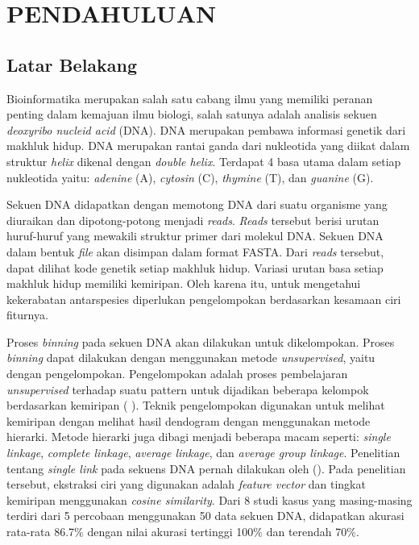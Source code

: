 \section*{PENDAHULUAN} %
\subsection*{Latar Belakang}
Bioinformatika merupakan salah satu cabang ilmu yang memiliki peranan penting dalam kemajuan ilmu biologi, salah satunya adalah analisis sekuen \textit{deoxyribo nucleid acid} (DNA). DNA merupakan pembawa informasi genetik dari makhluk hidup. DNA merupakan rantai ganda dari nukleotida yang diikat dalam struktur \textit{helix} dikenal dengan \textit{double helix}.  Terdapat 4 basa utama dalam setiap nukleotida yaitu: \textit{adenine} (A), \textit{cytosin} (C), \textit{thymine} (T), dan \textit{guanine} (G).

Sekuen DNA didapatkan dengan memotong DNA dari suatu organisme yang diuraikan dan dipotong-potong menjadi \textit{reads}. \textit{Reads} tersebut berisi urutan huruf-huruf yang mewakili struktur primer dari molekul DNA. Sekuen DNA dalam bentuk \textit{file} akan disimpan dalam format FASTA. Dari \textit{reads} tersebut, dapat dilihat kode genetik setiap makhluk hidup. Variasi urutan basa setiap makhluk hidup memiliki kemiripan. Oleh karena itu, untuk mengetahui kekerabatan antarspesies diperlukan pengelompokan berdasarkan kesamaan ciri fiturnya.

Proses \textit{binning} pada sekuen DNA akan dilakukan untuk dikelompokan. Proses \textit{binning} dapat dilakukan dengan menggunakan metode \textit{unsupervised}, yaitu dengan pengelompokan. Pengelompokan adalah proses pembelajaran \textit{unsupervised} terhadap suatu pattern untuk dijadikan beberapa kelompok berdasarkan kemiripan (\citeauthor{JAIN1999} \cite*{JAIN1999}). Teknik pengelompokan digunakan untuk melihat kemiripan dengan melihat hasil dendogram dengan menggunakan metode hierarki. Metode hierarki juga dibagi menjadi beberapa macam seperti: \textit{single linkage}, \textit{complete linkage}, \textit{average linkage},  dan \textit{average group linkage}. Penelitian tentang \textit{single link} pada sekuens DNA pernah dilakukan oleh \citeauthor{TAMSIN2013} (\cite*{TAMSIN2013}). Pada penelitian tersebut, ekstraksi ciri yang digunakan adalah \textit{feature vector} dan tingkat kemiripan menggunakan \textit{cosine similarity}. Dari 8 studi kasus yang masing-masing terdiri dari 5 percobaan menggunakan 50 data sekuen DNA, didapatkan akurasi rata-rata 86.7$\%$ dengan nilai akurasi tertinggi 100$\%$ dan terendah 70$\%$. 

